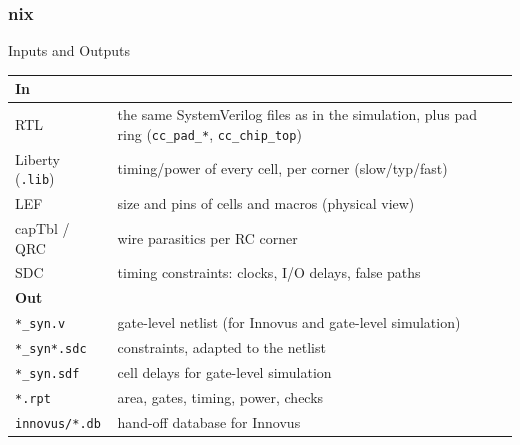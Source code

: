 \documentclass{beamer}
\newcommand{\astitle}{nix}
\newcommand{\assubtitle}{nix}
\newcommand{\cmd}[1]{\texttt{#1}}
\begin{document}
\renewcommand{\assubtitle}{Inputs and Outputs}
\begin{frame}
\frametitle{\astitle}
\begin{block}{\assubtitle}
  \footnotesize
  \begin{tabularx}{\linewidth}{@{}lY@{}}
    \textbf{In}           & \\\hline
    RTL                   & the same SystemVerilog files as in the simulation,
                            plus pad ring (\cmd{cc\_pad\_*}, \cmd{cc\_chip\_top})\\[1pt]
    Liberty (\cmd{.lib})  & timing/power of every cell, per corner (slow/typ/fast)\\[1pt]
    LEF                   & size and pins of cells and macros (physical view)\\[1pt]
    capTbl / QRC          & wire parasitics per RC corner\\[1pt]
    SDC                   & timing constraints: clocks, I/O delays, false paths\\[4pt]
    \textbf{Out}          & \\\hline
    \cmd{*\_syn.v}        & gate-level netlist (for Innovus and gate-level simulation)\\[1pt]
    \cmd{*\_syn*.sdc}     & constraints, adapted to the netlist\\[1pt]
    \cmd{*\_syn.sdf}      & cell delays for gate-level simulation\\[1pt]
    \cmd{*.rpt}           & area, gates, timing, power, checks\\[1pt]
    \cmd{innovus/*.db}    & hand-off database for Innovus\\
  \end{tabularx}
\end{block}
\end{frame}
\end{document}
